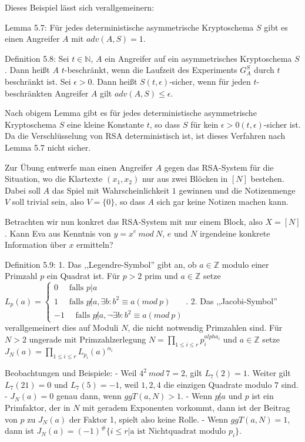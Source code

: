 \documentclass[a4paper]{article}
\begin{document}
\begin{multicols}{3}
        Dieses Beispiel lässt sich verallgemeinern:

        Lemma 5.7: Für jedes deterministische asymmetrische Kryptoschema $S$ gibt es einen Angreifer $A$ mit $adv(A,S) = 1$.

        Definition 5.8: Sei $t\in\mathbb{N}$, $A$ ein Angreifer auf ein asymmetrisches Kryptoschema $S$. Dann heißt $A$ $t$-beschränkt, wenn die Laufzeit des Experiments $G^S_A$ durch $t$ beschränkt ist.
        Sei $\epsilon >0$. Dann heißt $S(t,\epsilon)$-sicher, wenn für jeden $t$-beschränkten Angreifer $A$ gilt $adv(A,S)\leq \epsilon$.

        Nach obigem Lemma gibt es für jedes deterministische asymmetrische Kryptoschema $S$ eine kleine Konstante $t$, so dass $S$ für kein $\epsilon >0 (t,\epsilon)$-sicher ist. Da die Verschlüsselung von RSA deterministisch ist, ist dieses Verfahren nach Lemma 5.7 nicht sicher.

        Zur Übung entwerfe man einen Angreifer $A$ gegen das RSA-System für die Situation, wo die Klartexte $(x_1,x_2)$ nur aus zwei Blöcken in $[N]$ bestehen. Dabei soll $A$ das Spiel mit Wahrscheinlichkeit $1$ gewinnen und die Notizenmenge $V$ soll trivial sein, also $V=\{0\}$, so dass $A$ sich gar keine Notizen machen kann.

        Betrachten wir nun konkret das RSA-System mit nur einem Block, also $X=[N]$. Kann Eva aus Kenntnis von $y=x^e\ mod\ N$, $e$ und $N$ irgendeine konkrete Information über $x$ ermitteln?

        Definition 5.9:
        1. Das ,,Legendre-Symbol'' gibt an, ob $a\in\mathbb{Z}$ modulo einer Primzahl $p$ ein Quadrat ist. Für $p>2$ prim und $a\in\mathbb{Z}$ setze $L_p(a) =\begin{cases} 0 \quad\text{ falls } p|a \\ 1 \quad\text{ falls } p\not|a, \exists b:b^2 \equiv a (mod\ p) \\ -1 \quad\text{ falls } p\not|a, \lnot\exists b:b^2 \equiv a (mod\ p)\end{cases}$.
        2. Das ,,Jacobi-Symbol'' verallgemeinert dies auf Moduli $N$, die nicht notwendig Primzahlen sind. Für $N>2$ ungerade mit Primzahlzerlegung $N=\prod_{1\leq i\leq r} p^{alpha_i}_i$ und $a\in\mathbb{Z}$ setze $J_N(a) =\prod_{1 \leq i\leq r} L_{p_i}(a)^{\alpha_i}$

        Beobachtungen und Beispiele:
        - Weil $4^2\ mod\ 7 = 2$, gilt $L_7(2) = 1$. Weiter gilt $L_7(21) = 0$ und $L_7(5) =-1$, weil $1,2,4$ die einzigen Quadrate modulo $7$ sind.
        - $J_N(a) = 0$ genau dann, wenn $ggT(a,N)>1$.
        - Wenn $p\not|a$ und $p$ ist ein Primfaktor, der in $N$ mit geradem Exponenten vorkommt, dann ist der Beitrag von $p$ zu $J_N(a)$ der Faktor 1, spielt also keine Rolle.
        - Wenn $ggT(a,N) = 1$, dann ist $J_N(a) = (-1)^{\#}\{i\leq r|\text{a ist Nichtquadrat modulo } p_i\}$.


\end{multicols}
\end{document}
